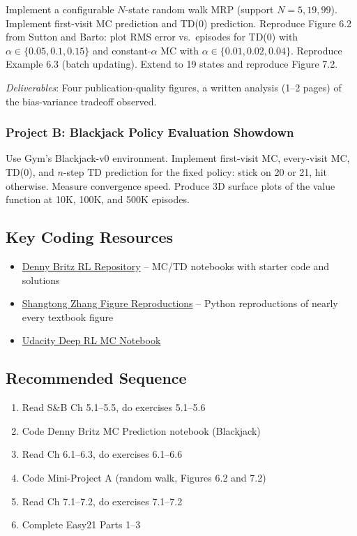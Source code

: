 \documentclass[11pt,letterpaper]{article}
\begin{document}
Implement a configurable $N$-state random walk MRP (support $N=5, 19, 99$). Implement first-visit MC prediction and TD(0) prediction. Reproduce Figure 6.2 from Sutton and Barto: plot RMS error vs.\ episodes for TD(0) with $\alpha \in \{0.05, 0.1, 0.15\}$ and constant-$\alpha$ MC with $\alpha \in \{0.01, 0.02, 0.04\}$. Reproduce Example 6.3 (batch updating). Extend to 19 states and reproduce Figure 7.2.

\textit{Deliverables}: Four publication-quality figures, a written analysis (1--2 pages) of the bias-variance tradeoff observed.

\subsubsection{Project B: Blackjack Policy Evaluation Showdown}

Use Gym's Blackjack-v0 environment. Implement first-visit MC, every-visit MC, TD(0), and $n$-step TD prediction for the fixed policy: stick on 20 or 21, hit otherwise. Measure convergence speed. Produce 3D surface plots of the value function at 10K, 100K, and 500K episodes.

\subsection{Key Coding Resources}

\begin{itemize}[nosep]
    \item \href{https://github.com/dennybritz/reinforcement-learning}{Denny Britz RL Repository} -- MC/TD notebooks with starter code and solutions
    \item \href{https://github.com/ShangtongZhang/reinforcement-learning-an-introduction}{Shangtong Zhang Figure Reproductions} -- Python reproductions of nearly every textbook figure
    \item \href{https://github.com/udacity/deep-reinforcement-learning/blob/master/monte-carlo/Monte_Carlo.ipynb}{Udacity Deep RL MC Notebook}
\end{itemize}

\subsection{Recommended Sequence}

\begin{enumerate}[nosep]
    \item Read S\&B Ch 5.1--5.5, do exercises 5.1--5.6
    \item Code Denny Britz MC Prediction notebook (Blackjack)
    \item Read Ch 6.1--6.3, do exercises 6.1--6.6
    \item Code Mini-Project A (random walk, Figures 6.2 and 7.2)
    \item Read Ch 7.1--7.2, do exercises 7.1--7.2
    \item Complete Easy21 Parts 1--3
\end{enumerate}
\end{document}
